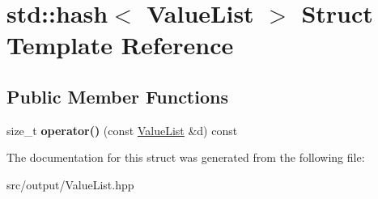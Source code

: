 \hypertarget{structstd_1_1hash_3_01ValueList_01_4}{}\section{std\+::hash$<$ Value\+List $>$ Struct Template Reference}
\label{structstd_1_1hash_3_01ValueList_01_4}
\subsection*{Public Member Functions}
\begin{DoxyCompactItemize}
\item 
\mbox{\label{structstd_1_1hash_3_01ValueList_01_4_ab9890ebe6ad98362e5f5b47587f30bd4}} 
size\+\_\+t {\bfseries operator()} (const \mbox{\hyperlink{classValueList}{Value\+List}} \&d) const
\end{DoxyCompactItemize}


The documentation for this struct was generated from the following file\+:\begin{DoxyCompactItemize}
\item 
src/output/Value\+List.\+hpp\end{DoxyCompactItemize}
